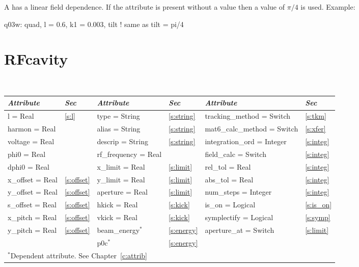 {{A  has a linear field dependence.
If the  attribute is present without a value then a value of $\pi/4$
is used.
Example:
\begin{example}
  q03w: quad, l = 0.6, k1 = 0.003, tilt  ! same as tilt = pi/4
\end{example}

\section{RFcavity}
\label{s:rfcav}

\begin{center}
\tt
\begin{tabular}{|l|l||l|l||l|l|} \hline
  {\sl Attribute} & {\sl Sec}  & {\sl Attribute} & {\sl Sec} & {\sl Attribute} & {\sl Sec} \\ \hline
  l        = Real     & \ref{s:l}      & type = String      & \ref{s:string} & tracking\_method = Switch   & \ref{s:tkm}   \\ \hline
  harmon   = Real     &                & alias = String     & \ref{s:string} & mat6\_calc\_method = Switch & \ref{s:xfer}  \\ \hline
  voltage  = Real     &                & descrip = String   & \ref{s:string} & integration\_ord = Integer  & \ref{s:integ} \\ \hline
  phi0     = Real     &                & rf\_frequency = Real &              & field\_calc = Switch        & \ref{s:integ} \\ \hline
  dphi0    = Real     &                & x\_limit = Real    & \ref{s:limit}  & rel\_tol = Real             & \ref{s:integ} \\ \hline
  x\_offset  = Real   & \ref{s:offset} & y\_limit = Real    & \ref{s:limit}  & abs\_tol = Real             & \ref{s:integ} \\ \hline
  y\_offset  = Real   & \ref{s:offset} & aperture = Real    & \ref{s:limit}  & num\_steps = Integer        & \ref{s:integ} \\ \hline
  s\_offset  = Real   & \ref{s:offset} & hkick    = Real    & \ref{s:kick}   & is\_on = Logical            & \ref{s:is_on} \\ \hline
  x\_pitch = Real     & \ref{s:offset} & vkick    = Real    & \ref{s:kick}   & symplectify = Logical       & \ref{s:symp}  \\ \hline
  y\_pitch = Real     & \ref{s:offset} & beam\_energy$^*$   & \ref{s:energy} & aperture\_at = Switch       & \ref{s:limit} \\ \hline
                      &                & p0c$^*$            & \ref{s:energy} &                             &               \\ \hline
  \multicolumn{6}{l}{\small $^*$Dependent attribute. See Chapter~\ref{c:attrib}} \\
\end{tabular}
\end{center}
\toffset

}}

